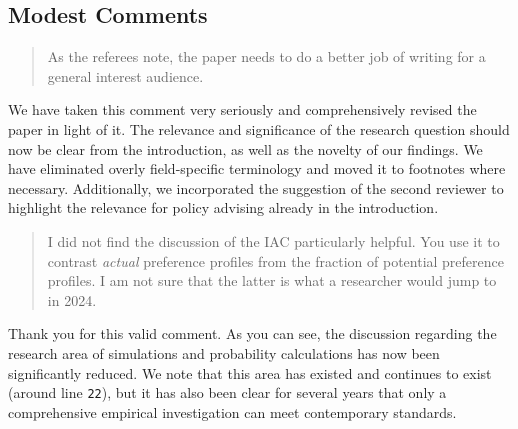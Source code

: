 \documentclass[a4paper, 12pt]{scrartcl}
\begin{document}
\subsection*{Modest Comments}
\begin{quotation}
 As the referees note, the paper needs to do a better job of writing for a general interest audience.
\end{quotation}

We have taken this comment very seriously and comprehensively revised the paper in light of it. The relevance and significance of the research question should now be clear from the introduction, as well as the novelty of our findings. We have eliminated overly field-specific terminology and moved it to footnotes where necessary. Additionally, we incorporated the suggestion of the second reviewer to highlight the relevance for policy advising already in the introduction.

\begin{quotation}
I did not find the discussion of the IAC particularly helpful. You use it to contrast \textit{actual}
preference profiles from the fraction of potential preference profiles. I am not sure that the
latter is what a researcher would jump to in 2024.
\end{quotation}

Thank you for this valid comment. As you can see, the discussion regarding the research area of simulations and probability calculations has now been significantly reduced. We note that this area has existed and continues to exist (around line \texttt{22}), but it has also been clear for several years that only a comprehensive empirical investigation can meet contemporary standards.






\end{document}
